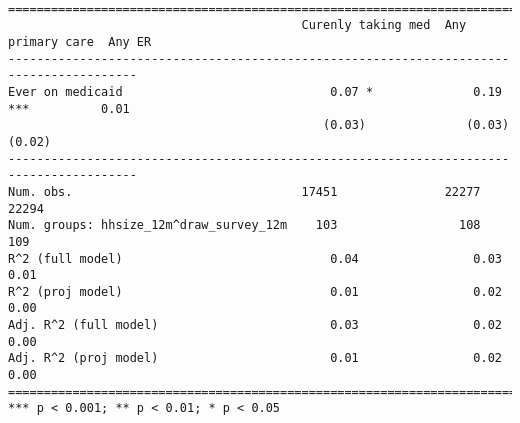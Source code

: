 \documentclass[
  letterpaper,
  DIV=11,
  numbers=noendperiod]{scrartcl}
\begin{document}
\begin{verbatim}

========================================================================================
                                         Curenly taking med  Any primary care  Any ER   
----------------------------------------------------------------------------------------
Ever on medicaid                             0.07 *              0.19 ***          0.01 
                                            (0.03)              (0.03)            (0.02)
----------------------------------------------------------------------------------------
Num. obs.                                17451               22277             22294    
Num. groups: hhsize_12m^draw_survey_12m    103                 108               109    
R^2 (full model)                             0.04                0.03              0.01 
R^2 (proj model)                             0.01                0.02              0.00 
Adj. R^2 (full model)                        0.03                0.02              0.00 
Adj. R^2 (proj model)                        0.01                0.02              0.00 
========================================================================================
*** p < 0.001; ** p < 0.01; * p < 0.05
\end{verbatim}
\end{document}
